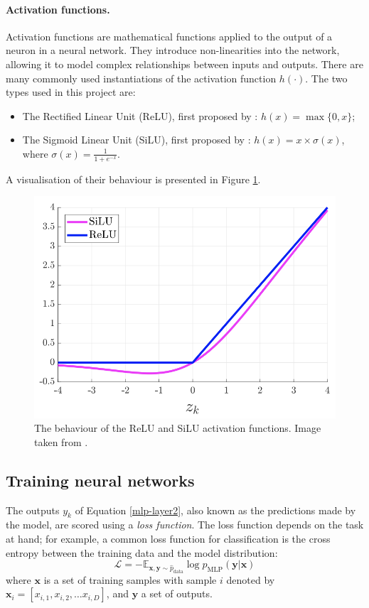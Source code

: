 \paragraph{Activation functions.} Activation functions are mathematical functions applied to the output of a neuron in a neural network. They introduce non-linearities into the network, allowing it to model complex relationships between inputs and outputs.
There are many commonly used instantiations of the activation function $h(\cdot)$. The two types used in this project are:
\begin{itemize}
    \item The Rectified Linear Unit (ReLU), first proposed by \citet{relu}: $h(x)=\max\{0, x\}$;
    \item The Sigmoid Linear Unit (SiLU), first proposed by \citet{gelu}: $h(x) = x\times\sigma(x)$, where $\sigma(x) = \frac{1}{1 + e^{-x}}$. 
\end{itemize}
A visualisation of their behaviour is presented in Figure \ref{relu-silu}.
\begin{figure}
    \centering
    \includegraphics[scale=0.5]{masters-report/figures/silu-relu.png}
    \caption{The behaviour of the ReLU and SiLU activation functions. Image taken from \cite{silu}.}
    \label{relu-silu}
\end{figure}
\subsection{Training neural networks}
The outputs $y_k$ of Equation \ref{mlp-layer2}, also known as the predictions made by the model, are scored using a \textit{loss function}. The loss function depends on the task at hand; for example, a common loss function for classification is the cross entropy between the training data and the model distribution:
\begin{equation}
    \mathcal{L} = -\mathbb{E}_{\mathbf{x}, \mathbf{y}\sim \hat{p}_\text{data}}\log p_{\text{MLP}}(\mathbf{y}|\mathbf{x})
\end{equation}
where $\mathbf{x}$ is a set of training samples with sample $i$ denoted by $\mathbf{x}_i = [x_{i, 1}, x_{i, 2},\dots x_{i, D}]$, and $\mathbf{y}$ a set of outputs. 

